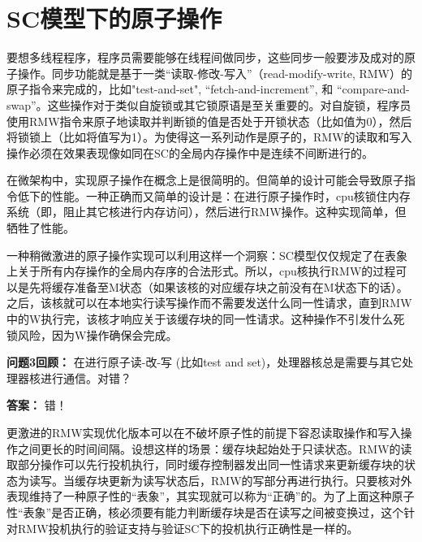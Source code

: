 \documentclass[UTF-8]{ctexrep}
\begin{document}
\section{SC模型下的原子操作}
\par 要想多线程程序，程序员需要能够在线程间做同步，这些同步一般要涉及成对的原子操作。同步功能就是基于一类“读取-修改-写入”（read-modify-write, RMW）的原子指令来完成的，比如"test-and-set", “fetch-and-increment”, 和 “compare-and-swap”。这些操作对于类似自旋锁或其它锁原语是至关重要的。对自旋锁，程序员使用RMW指令来原子地读取并判断锁的值是否处于开锁状态（比如值为0），然后将锁锁上（比如将值写为1）。为使得这一系列动作是原子的，RMW的读取和写入操作必须在效果表现像如同在SC的全局内存操作中是连续不间断进行的。
\par 在微架构中，实现原子操作在概念上是很简明的。但简单的设计可能会导致原子指令低下的性能。一种正确而又简单的设计是：在进行原子操作时，cpu核锁住内存系统（即，阻止其它核进行内存访问），然后进行RMW操作。这种实现简单，但牺牲了性能。
\par 一种稍微激进的原子操作实现可以利用这样一个洞察：SC模型仅仅规定了在表象上关于所有内存操作的全局内存序的合法形式。所以，cpu核执行RMW的过程可以是先将缓存准备至M状态（如果该核的对应缓存块之前没有在M状态下的话）。之后，该核就可以在本地实行读写操作而不需要发送什么同一性请求，直到RMW中的W执行完，该核才响应关于该缓存块的同一性请求。这种操作不引发什么死锁风险，因为W操作确保会完成。
\begin{sidebarbox}
\par \textbf {问题3回顾：}  在进行原子读-改-写 (比如test and set)，处理器核总是需要与其它处理器核进行通信。对错？
\par \textbf{答案：} 错！
\end{sidebarbox}
\par 更激进的RMW实现优化版本可以在不破坏原子性的前提下容忍读取操作和写入操作之间更长的时间间隔。设想这样的场景：缓存块起始处于只读状态。RMW的读取部分操作可以先行投机执行，同时缓存控制器发出同一性请求来更新缓存块的状态为读写。当缓存块更新为读写状态后，RMW的写部分再进行执行。只要核对外表现维持了一种原子性的“表象”，其实现就可以称为“正确”的。为了上面这种原子性“表象”是否正确，核必须要有能力判断缓存块是否在读写之间被变换过，这个针对RMW投机执行的验证支持与验证SC下的投机执行正确性是一样的。
\end{document}
